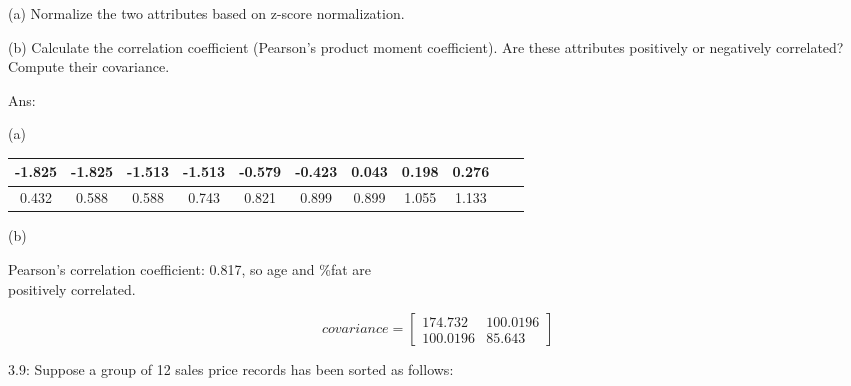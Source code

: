 	\vspace{0.5\baselineskip}

	\begin{description}

		\item (a) Normalize the two attributes based on z-score normalization.
		\item (b) Calculate the correlation coefficient (Pearson’s product moment coefficient).
		Are these attributes positively or negatively correlated?
		Compute their covariance.

		\vspace{0.5\baselineskip}

		Ans:

		\begin{description}
			\item (a)
		\end{description}

		\begin{center}
		\begin{tabular}{ |c|c|c|c|c|c|c|c|c|c|c| }
			\hline
			-1.825 & -1.825 & -1.513 & -1.513 & -0.579 & -0.423 & 0.043 & 0.198 & 0.276 \\
			\hline
			0.432 & 0.588 & 0.588 & 0.743 & 0.821 & 0.899 & 0.899 & 1.055 & 1.133 \\
			\hline
		\end{tabular}
		\end{center}
			
		\begin{description}
		
			\item (b)
			\item[\hspace{0.75cm}] Pearson’s correlation coefficient: 0.817, so age and \%fat are \\ positively correlated.
		
		\end{description}
		
		$$
		covariance = 
		\begin{bmatrix}
			174.732 & 100.0196 \\
			100.0196 & 85.643
		\end{bmatrix}
		$$
		
	\end{description}


	\clearpage

	3.9: Suppose a group of 12 sales price records has been sorted as follows:


